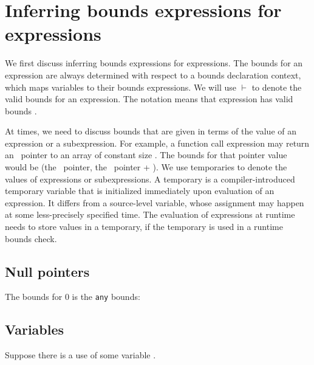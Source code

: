 \section{Inferring bounds expressions for expressions}
\label{section:inferring-expression-bounds}

We first discuss inferring bounds expressions for expressions. The bounds for an
expression are always determined with respect to a bounds
declaration context, which maps variables to their
bounds expressions.  We will use $\vdash$ to denote the
valid bounds for an expression. The notation 
means that expression  has valid bounds .

At times, we need to discuss bounds that are given in terms of the value
of an expression or a subexpression.   For example, a function call expression may
return an \arrayptr\ pointer to an array of constant size
. The bounds for that pointer value would be (the
\arrayptr\ pointer, the \arrayptr\ pointer +
). We use temporaries to denote the values
of expressions or subexpressions.   A temporary is a compiler-introduced
temporary variable that is initialized immediately upon evaluation of an
expression.   It differs from a source-level variable, whose assignment
may happen at some less-precisely specified time.   The evaluation of
expressions at runtime needs to store values in a temporary, 
if the temporary is used in a runtime
bounds check.

\subsection{Null pointers}

The bounds for 0 is the \lstinline|any| bounds:


\subsection{Variables}
\label{section:checking-variables}

Suppose there is a use of some variable .

